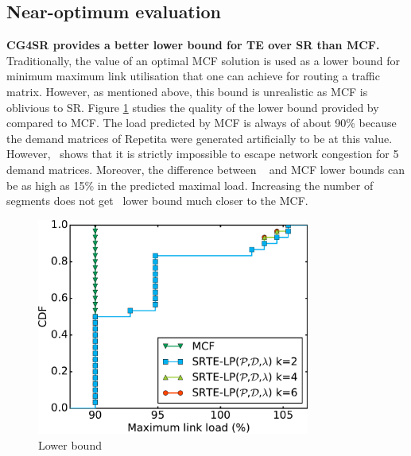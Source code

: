 \subsection{Near-optimum evaluation}

\textbf{CG4SR provides a better lower bound for TE over SR than MCF.} Traditionally, the value of an optimal
MCF solution is used as a lower bound for
minimum maximum link utilisation that one can achieve for routing a traffic matrix. However, as mentioned
above, this bound is unrealistic as MCF is oblivious to SR. Figure \ref{fig:optimum_lowerbound} studies the quality of the lower
bound provided by \name~ compared to MCF.
The load predicted by MCF is always of about 90\% because the demand matrices of Repetita \cite{repetita}
were generated artificially to be at this value.
However, \name~shows that it is strictly impossible to escape network congestion for 5 demand matrices.
Moreover, the difference between \name~ and MCF lower bounds can be as high as 15\% in the predicted maximal load.
Increasing the number of segments does not get \name~lower bound much closer to the MCF.

\begin{figure}
\begin{center}
\includegraphics[width=0.8\textwidth]{images/solver_lower_bound_seg_cmp.2016RocketFuelUCL.cdfs.pdf}
\end{center}
\caption{Lower bound}
\label{fig:optimum_lowerbound}
\end{figure}



